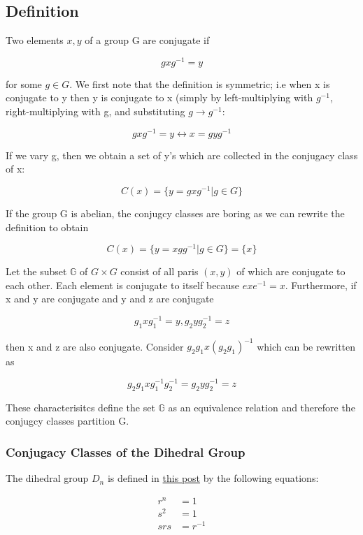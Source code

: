 
\subsection{Definition}\label{definition}

Two elements \(x,y\) of a group G are conjugate if

\[
gxg^{-1} = y
\]

for some \(g \in G\). We first note that the definition is symmetric;
i.e when x is conjugate to y then y is conjugate to x (simply by
left-multiplying with \(g^{-1}\), right-multiplying with g, and
substituting \(g \rightarrow g^{-1}\):

\[
gxg^{-1} = y \leftrightarrow x = gyg^{-1}
\]

If we vary g, then we obtain a set of y's which are collected in the
conjugacy class of x:

\[
C(x) = \{y = gxg^{-1} | g \in G\}
\]

If the group G is abelian, the conjugcy classes are boring as we can
rewrite the definition to obtain

\[
C(x) = \{y = xgg^{-1} | g \in G\} = \{x\}
\]

Let the subset \(\mathbb{G}\) of \(G \times G\) consist of all paris
\((x,y)\) of which are conjugate to each other. Each element is
conjugate to itself because \(exe^{-1} = x\). Furthermore, if x and y
are conjugate and y and z are conjugate

\[
g_1 x g_1^{-1} = y, g_2 y g_2^{-1} = z
\]

then x and z are also conjugate. Consider \(g_2 g_1 x (g_2 g_1)^{-1}\)
which can be rewritten as

\[
g_2 g_1 x g_1^{-1} g_2^{-1} = g_2 y g_2^{-1} = z
\]

These characterisitcs define the set \(\mathbb{G}\) as an equivalence
relation and therefore the conjugcy classes partition G.

\subsubsection{Conjugacy Classes of the Dihedral
Group}\label{conjugacy-classes-of-the-dihedral-group}

The dihedral group \(D_n\) is defined in
\href{\%7Bfilename\%7D/2016-03-15-groups_04.markdown}{this post} by the
following equations:


\begin{align*}
r^n &= 1 \\
s^2 &= 1 \\
srs &= r^{-1}
\end{align*}



